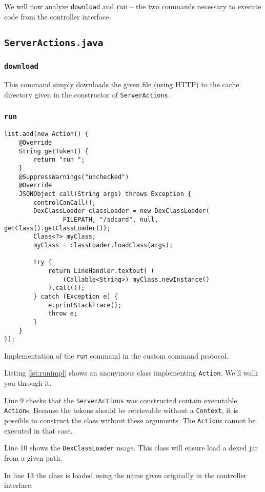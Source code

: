 \documentclass[a4paper]{report}
\newcommand{\classname}[1]{\texttt{#1}}
\newcommand{\filename}[1]{\texttt{#1}}
\begin{document}
{We will now analyze \texttt{download} and \texttt{run} -- the two commands necessary to execute code from the controller interface.

\subsection{\filename{ServerActions.java}}
\subsubsection{\texttt{download}}
This command simply downloads the given file (using HTTP) to the cache directory given in the constructor of \classname{ServerActions}.
\subsubsection{\texttt{run}}
\begin{listing}[H]
\begin{verbatim}
list.add(new Action() {
	@Override
	String getToken() {
		return "run ";
	}
	@SuppressWarnings("unchecked")
	@Override
	JSONObject call(String args) throws Exception {
		controlCanCall();
		DexClassLoader classLoader = new DexClassLoader(
				FILEPATH, "/sdcard", null, getClass().getClassLoader());
		Class<?> myClass;
		myClass = classLoader.loadClass(args);

		try {
			return LineHandler.textout( (
				(Callable<String>) myClass.newInstance()
			).call());
		} catch (Exception e) {
			e.printStackTrace();
			throw e;
		}
	}
});
\end{verbatim}
\caption{Implementation of the \texttt{run} command in the custom command protocol.}
\label{lst:runimpl}
\end{listing}

Listing \ref{lst:runimpl} shows an anonymous class implementing \classname{Action}. We'll walk you through it.

Line 9 checks that the \classname{ServerActions} was constructed contain executable \classname{Action}s. Because the tokens should be retrievable without a \classname{Context}, it is possible to construct the class without these arguments. The \classname{Action}s cannot be executed in that case.

Line 10 shows the \classname{DexClassLoader} usage. This class will ensure load a dexed jar from a given path.

In line 13 the class is loaded using the name given originally in the controller interface.

}
\end{document}
